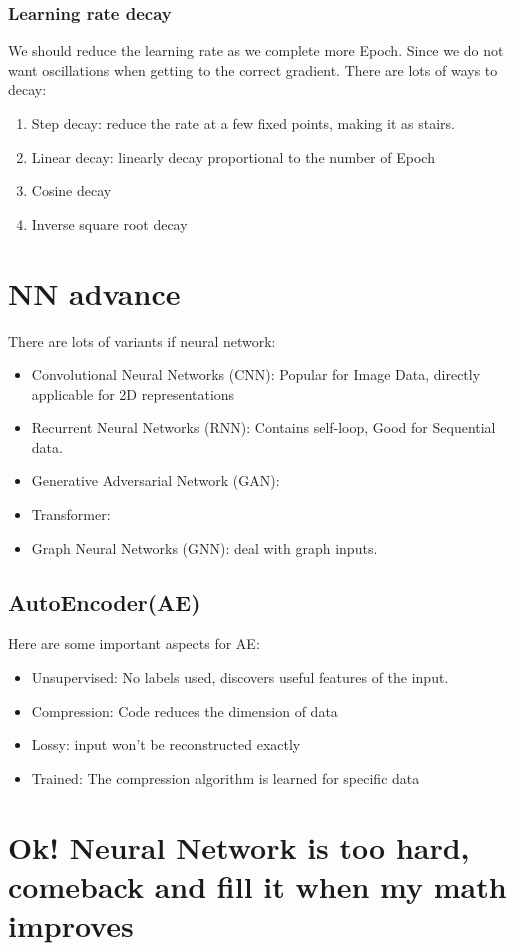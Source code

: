 \documentclass[letterpaper,12pt]{article}
\begin{document}
\subsubsection{Learning rate decay}
We should reduce the learning rate as we complete more Epoch. Since we do not want oscillations when getting to the correct gradient. There are lots of ways to decay:\begin{enumerate}
    \item Step decay: reduce the rate at a few fixed points, making it as stairs.
    \item Linear decay: linearly decay proportional to the number of Epoch
    \item Cosine decay
    \item Inverse square root decay
\end{enumerate}

\section{NN advance}
There are lots of variants if neural network:\begin{itemize}
    \item Convolutional Neural Networks (CNN): Popular for Image Data, directly applicable for 2D representations
    \item Recurrent Neural Networks (RNN): Contains self-loop, Good for Sequential data.
    \item Generative Adversarial Network (GAN):
    \item Transformer: 
    \item Graph Neural Networks (GNN): deal with graph inputs. 
\end{itemize}
\subsection{AutoEncoder(AE)}
Here are some important aspects for AE:\begin{itemize}
    \item Unsupervised: No labels used, discovers useful features of the input. 
    \item Compression: Code reduces the dimension of data
    \item Lossy: input won't be reconstructed exactly
    \item Trained: The compression algorithm is learned for specific data
\end{itemize}

\section{Ok! Neural Network is too hard, comeback and fill it when my math improves}
\end{document}
